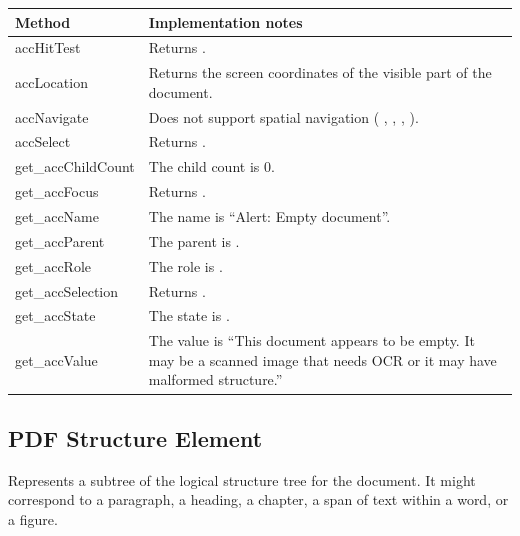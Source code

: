 \documentclass[letterpaper,12pt,english,openany,oneside]{sphinxmanual}
\begin{document}
\begin{savenotes}\sphinxattablestart
\centering
{}\label{\detokenize{MSAA_PDF:section-20}}\nobreak
\begin{tabulary}{\linewidth}[t]{|T|T|}
\hline
\sphinxstyletheadfamily 
Method
&\sphinxstyletheadfamily 
Implementation notes
\\
\hline
accHitTest
&
Returns  .
\\
\hline
accLocation
&
Returns the screen coordinates of the visible part of the document.
\\
\hline
accNavigate
&
Does not support spatial navigation ( ,  ,  ,  ).
\\
\hline
accSelect
&
Returns  .
\\
\hline
get\_accChildCount
&
The child count is 0.
\\
\hline
get\_accFocus
&
Returns  .
\\
\hline
get\_accName
&
The name is “Alert: Empty document”.
\\
\hline
get\_accParent
&
The parent is  .
\\
\hline
get\_accRole
&
The role is  .
\\
\hline
get\_accSelection
&
Returns  .
\\
\hline
get\_accState
&
The state is  .
\\
\hline
get\_accValue
&
The value is “This document appears to be empty. It may be a scanned image that needs OCR or it may have malformed structure.”
\\
\hline
\end{tabulary}
\par
\sphinxattableend\end{savenotes}




\subsection{PDF Structure Element}
\label{\detokenize{MSAA_PDF:pdf-structure-element}}
Represents a subtree of the logical structure tree for the document. It might correspond to a paragraph, a heading, a chapter, a span of text within a word, or a figure.
\end{document}
